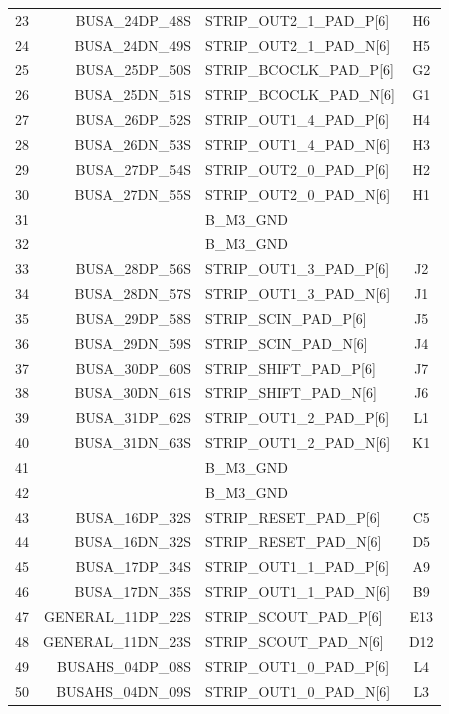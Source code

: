 \documentclass[11pt]{article}
\begin{document}
\begin{table}
\begin{center}
\begin{tabular}{|c|r|l|c|}
23 &   BUSA\_24DP\_48S & STRIP\_OUT2\_1\_PAD\_P[6]  & H6 \\
24 &   BUSA\_24DN\_49S & STRIP\_OUT2\_1\_PAD\_N[6]  & H5 \\ \hline
25 &   BUSA\_25DP\_50S & STRIP\_BCOCLK\_PAD\_P[6]   & G2 \\
26 &   BUSA\_25DN\_51S & STRIP\_BCOCLK\_PAD\_N[6]   & G1 \\ \hline
27 &   BUSA\_26DP\_52S & STRIP\_OUT1\_4\_PAD\_P[6]  & H4 \\
28 &   BUSA\_26DN\_53S & STRIP\_OUT1\_4\_PAD\_N[6]  & H3 \\ \hline
29 &   BUSA\_27DP\_54S & STRIP\_OUT2\_0\_PAD\_P[6]  & H2 \\
30 &   BUSA\_27DN\_55S & STRIP\_OUT2\_0\_PAD\_N[6]  & H1 \\ \hline
31 &                   & B\_M3\_GND                 & \\
32 &                   & B\_M3\_GND                 & \\ \hline
33 &   BUSA\_28DP\_56S & STRIP\_OUT1\_3\_PAD\_P[6]  & J2 \\
34 &   BUSA\_28DN\_57S & STRIP\_OUT1\_3\_PAD\_N[6]  & J1 \\ \hline
35 &   BUSA\_29DP\_58S & STRIP\_SCIN\_PAD\_P[6]     & J5 \\
36 &   BUSA\_29DN\_59S & STRIP\_SCIN\_PAD\_N[6]     & J4 \\ \hline
37 &   BUSA\_30DP\_60S & STRIP\_SHIFT\_PAD\_P[6]    & J7 \\
38 &   BUSA\_30DN\_61S & STRIP\_SHIFT\_PAD\_N[6]    & J6 \\ \hline
39 &   BUSA\_31DP\_62S & STRIP\_OUT1\_2\_PAD\_P[6]  & L1 \\
40 &   BUSA\_31DN\_63S & STRIP\_OUT1\_2\_PAD\_N[6]  & K1 \\ \hline
41 &                   & B\_M3\_GND                 & \\
42 &                   & B\_M3\_GND                 & \\ \hline
43 &   BUSA\_16DP\_32S & STRIP\_RESET\_PAD\_P[6]    & C5 \\
44 &   BUSA\_16DN\_32S & STRIP\_RESET\_PAD\_N[6]    & D5 \\ \hline
45 &   BUSA\_17DP\_34S & STRIP\_OUT1\_1\_PAD\_P[6]  & A9 \\
46 &   BUSA\_17DN\_35S & STRIP\_OUT1\_1\_PAD\_N[6]  & B9 \\ \hline
47 & GENERAL\_11DP\_22S & STRIP\_SCOUT\_PAD\_P[6]   & E13 \\
48 & GENERAL\_11DN\_23S & STRIP\_SCOUT\_PAD\_N[6]   & D12 \\ \hline
49 &  BUSAHS\_04DP\_08S & STRIP\_OUT1\_0\_PAD\_P[6] & L4 \\
50 &  BUSAHS\_04DN\_09S & STRIP\_OUT1\_0\_PAD\_N[6] & L3 \\ \hline
\end{tabular}
\end{center}
\end{table}
\end{document}
